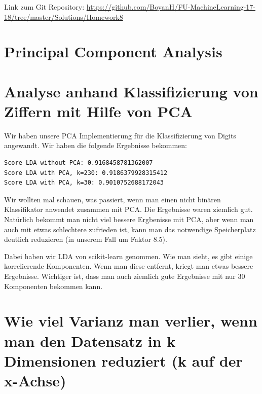 \usepackage{graphicx}
\usepackage{amsmath}
\usepackage{amssymb}
\usepackage{fancyvrb}

\newcommand{\dozent}{Prof. R. Rojas}					%
\newcommand{\projectNo}{8}
\newcommand{\veranstaltung}{Mustererkennung}
\newcommand{\semester}{WS17/18}
\newcommand{\studenten}{Boyan Hristov, Nedeltscho Petrov}





Link zum Git Repository: \url{https://github.com/BoyanH/FU-MachineLearning-17-18/tree/master/Solutions/Homework\projectNo}

\section*{Principal Component Analysis}

\section*{Analyse anhand Klassifizierung von Ziffern mit Hilfe von PCA}

Wir haben unsere PCA Implementierung für die Klassifizierung von Digits angewandt. Wir haben die folgende
Ergebnisse bekommen:

\begin{lstlisting}
Score LDA without PCA: 0.9168458781362007
Score LDA with PCA, k=230: 0.9186379928315412
Score LDA with PCA, k=30: 0.9010752688172043

\end{lstlisting}

Wir wollten mal schauen, was passiert, wenn man einen nicht binären Klassifikator anwendet zusammen mit PCA. Die
Ergebnisse waren ziemlich gut. Natürlich bekommt man nicht viel bessere Ergbenisse mit PCA, aber wenn man auch mit etwas
schlechtere zufrieden ist, kann man das notwendige Speicherplatz deutlich reduzieren (in unserem Fall um Faktor 8.5).

Dabei haben wir LDA von scikit-learn genommen. Wie man sieht, es gibt einige korrelierende Komponenten. Wenn man diese
entfernt, kriegt man etwas bessere Ergebnisse. Wichtiger ist, dass man auch ziemlich gute Ergebnisse mit nur 30
Komponenten bekommen kann.

\section*{Wie viel Varianz man verlier, wenn man den Datensatz in k Dimensionen  reduziert (k auf der x-Achse)}

